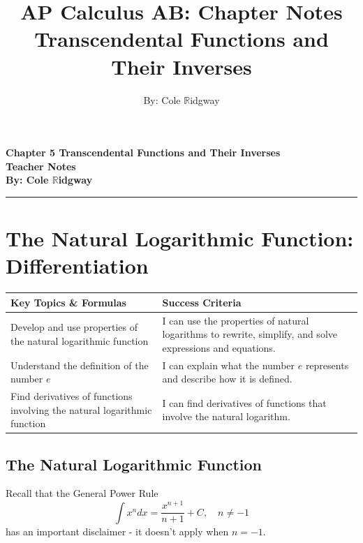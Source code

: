 \documentclass[12pt, letterpaper]{article}
\title{\textbf{AP Calculus AB: Chapter \mychapter{} Notes}\\ \large Transcendental Functions and Their Inverses}
\author{By: Cole $\mathbb{R}$idgway}
\date{}
\renewcommand{\maketitle}{
    \begin{center}
        \vspace{-2cm} %
        \LARGE \bfseries \textbf{Chapter 5 Transcendental Functions and Their Inverses} \\[1ex] 
        \large  Teacher Notes\\[1ex]
        \large By: Cole $\mathbb{R}$idgway \\[1ex]
        \vspace{0cm} %
    \end{center}
}
\begin{document}
\maketitle

\thispagestyle{empty}   %

\tableofcontents
\vspace{1em}
\hrule
\vspace{1em}

\newpage
\setcounter{page}{1}    %
\section{The Natural Logarithmic Function: Differentiation}

\begin{objectives}
    \renewcommand{\arraystretch}{1.5} %
    \begin{tabularx}{\textwidth}{@{} >{\raggedright\arraybackslash}X >{\raggedright\arraybackslash}X @{}}
        
        \textbf{Key Topics \& Formulas} & \textbf{Success Criteria} \\ 
        \midrule[1.5pt] %
        
        Develop and use properties of the natural logarithmic function 
        & I can use the properties of natural logarithms to rewrite, simplify, and solve expressions and equations. \\
        \midrule %
        
        Understand the definition of the number $e$ 
        & I can explain what the number $e$ represents and describe how it is defined. \\
        \midrule
        
        Find derivatives of functions involving the natural logarithmic function 
        & I can find derivatives of functions that involve the natural logarithm. \\
        
    \end{tabularx}
\end{objectives}

\subsection{The Natural Logarithmic Function}
Recall that the General Power Rule 
$$\int x^n dx = \frac{x^{n+1}}{n+1}+C, \quad n \neq -1$$
has an important disclaimer - it doesn't apply when $n = -1$. \\
\end{document}
